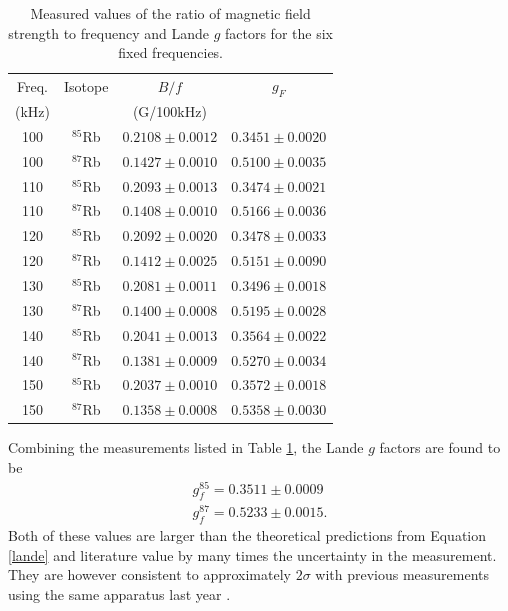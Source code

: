 \begin{table}[htb]
\caption{\label{g} Measured values of the ratio of magnetic field strength to frequency and Lande $g$ factors for the six fixed frequencies. }
\begin{tabular}{|c|c|c|c|}
\hline
Freq. & Isotope & $B/f$ & $g_F$ \\
(kHz) & & (G/100kHz) & \\
\hline
100 & $^{85}$Rb & $0.2108\pm0.0012$ & $0.3451\pm0.0020$\\
100 & $^{87}$Rb & $0.1427\pm0.0010$ & $0.5100\pm0.0035$ \\
\hline
110 & $^{85}$Rb & $0.2093\pm0.0013$ & $0.3474\pm0.0021$\\
110 & $^{87}$Rb & $0.1408\pm0.0010$ & $0.5166\pm0.0036$ \\
\hline
120 & $^{85}$Rb & $0.2092\pm0.0020$ & $0.3478\pm0.0033$ \\
120 & $^{87}$Rb & $0.1412\pm0.0025$ & $0.5151\pm0.0090$ \\
\hline
130 & $^{85}$Rb & $0.2081\pm0.0011$ & $0.3496\pm0.0018$ \\
130 & $^{87}$Rb & $0.1400\pm0.0008$ & $0.5195\pm0.0028$ \\
\hline
140 & $^{85}$Rb & $0.2041\pm0.0013$ & $0.3564\pm0.0022$ \\
140 & $^{87}$Rb & $0.1381\pm0.0009$ & $0.5270\pm0.0034$ \\
\hline
150 & $^{85}$Rb & $0.2037\pm0.0010$ & $0.3572\pm0.0018$ \\
150 & $^{87}$Rb & $0.1358\pm0.0008$ & $0.5358\pm0.0030$ \\
\hline
\end{tabular}
\end{table}

Combining the measurements listed in Table \ref{g}, the Lande $g$ factors are found to be
\begin{equation}
\begin{split}
g_{f}^{85} = 0.3511\pm0.0009 \\
g_{f}^{87} = 0.5233\pm0.0015.
\end{split}
\end{equation}
Both of these values are larger than the theoretical predictions from Equation \ref{lande} and literature value \cite{amv} by many times the uncertainty in the measurement. They are however consistent to approximately $2\sigma$ with previous measurements using the same apparatus last year \cite{pras}. 

